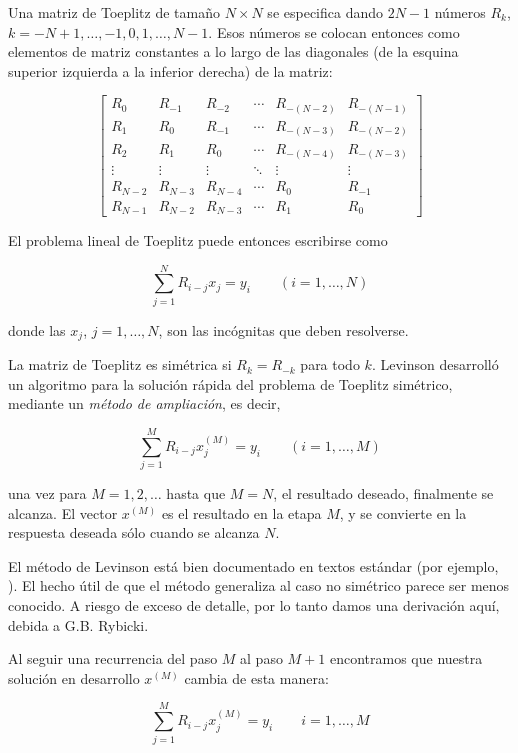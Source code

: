 \documentclass[10pt,a4paper]{book}
\begin{document}
Una matriz de Toeplitz de tamaño $N \times N$ se especifica dando $2N - 1$ números $R_k$, $k = -N + 1, \ldots, -1, 0, 1, \ldots, N - 1$. Esos números se colocan entonces como elementos de matriz constantes a lo largo de las diagonales (de la esquina superior izquierda a la inferior derecha) de la matriz:

\[
\begin{bmatrix}
R_0 & R_{-1} & R_{-2} & \cdots & R_{-(N-2)} & R_{-(N-1)} \\
R_1 & R_0 & R_{-1} & \cdots & R_{-(N-3)} & R_{-(N-2)} \\
R_2 & R_1 & R_0 & \cdots & R_{-(N-4)} & R_{-(N-3)} \\
\vdots & \vdots & \vdots & \ddots & \vdots & \vdots \\
R_{N-2} & R_{N-3} & R_{N-4} & \cdots & R_0 & R_{-1} \\
R_{N-1} & R_{N-2} & R_{N-3} & \cdots & R_1 & R_0
\end{bmatrix}
\tag{2.8.8}
\]

El problema lineal de Toeplitz puede entonces escribirse como

\[
\sum_{j=1}^{N} R_{i-j} x_j = y_i \qquad (i = 1, \ldots, N)
\tag{2.8.9}
\]

donde las $x_j$, $j = 1, \ldots, N$, son las incógnitas que deben resolverse.

La matriz de Toeplitz es simétrica si $R_k = R_{-k}$ para todo $k$. Levinson \cite{4} desarrolló un algoritmo para la solución rápida del problema de Toeplitz simétrico, mediante un \emph{método de ampliación}, es decir,

\[
\sum_{j=1}^{M} R_{i-j} x_j^{(M)} = y_i \qquad (i = 1, \ldots, M)
\tag{2.8.10}
\]

una vez para $M = 1, 2, \ldots$ hasta que $M = N$, el resultado deseado, finalmente se alcanza. El vector $x^{(M)}$ es el resultado en la etapa $M$, y se convierte en la respuesta deseada sólo cuando se alcanza $N$.

El método de Levinson está bien documentado en textos estándar (por ejemplo, \cite{5}). El hecho útil de que el método generaliza al caso no simétrico parece ser menos conocido. A riesgo de exceso de detalle, por lo tanto damos una derivación aquí, debida a G.B. Rybicki.

Al seguir una recurrencia del paso $M$ al paso $M + 1$ encontramos que nuestra solución en desarrollo $x^{(M)}$ cambia de esta manera:

\[
\sum_{j=1}^{M} R_{i-j} x_j^{(M)} = y_i \qquad i = 1, \ldots, M
\tag{2.8.11}
\]
\end{document}

